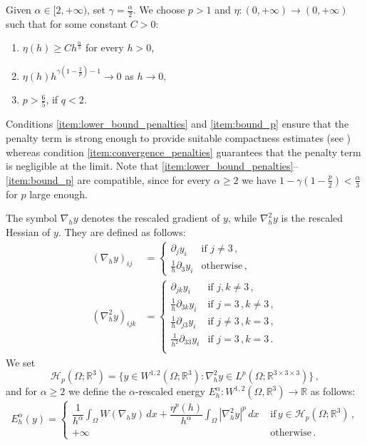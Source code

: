 \documentclass{article}
\theoremstyle{plain}
\theoremstyle{plain}
\theoremstyle{plain}
\theoremstyle{plain}
\theoremstyle{plain}
\theoremstyle{definition}
\theoremstyle{definition}
\renewcommand{\r}{\mathbb{R}}
\newcommand{\dint}{\displaystyle\int}
\begin{document}
Given $\alpha \in [2, +\infty)$, set $\gamma = \frac{\alpha}{2}$. We choose $p > 1$ and $\eta \colon (0, +\infty) \to (0, +\infty)$ such that for some constant $C > 0$:
\begin{enumerate}[start=1,label={(P\arabic*)}]
    \item $\eta(h) \geq C h^{\frac{\alpha}{3}}$ for every $h > 0$, \label{item:lower_bound_penalties} 
    \item $\eta(h) h^{\gamma(1-\frac{2}{p}) - 1} \to 0$ as $h \to 0$, \label{item:convergence_penalties}
    \item $p > \frac{6}{5}$, if $q < 2$. \label{item:bound_p}
\end{enumerate}
Conditions \ref{item:lower_bound_penalties} and \ref{item:bound_p} ensure that the penalty term is strong enough to provide suitable compactness estimates (see ) whereas condition \ref{item:convergence_penalties} guarantees that the penalty term is negligible at the limit.
Note that \ref{item:lower_bound_penalties}--\ref{item:bound_p} are compatible, since for every $ \alpha \geq 2 $ we have $ 1-\gamma(1- \frac{p}{2}) < \frac{\alpha}{3} $ for $ p $ large enough. 

The symbol $\nabla_h y$ denotes the rescaled gradient of $y$, while $\nabla_h^2 y$ is the rescaled Hessian of $y$. They are defined as follows:
\begin{align}
	(\nabla_h y)_{ij} & = \begin{cases}
		\partial_j y_i & \text{if } j \neq 3\,,\\
		\frac{1}{h} \partial_3 y_i & \text{otherwise}\,,
	\end{cases}\\
	(\nabla_h^2 y)_{ijk} & = \begin{cases}
		\partial_{jk} y_i & \text{if } j,k \neq 3\,,\\
		\frac{1}{h} \partial_{3k} y_i & \text{if } j = 3\,,k \neq 3\,,\\
		\frac{1}{h} \partial_{j3} y_i & \text{if } j \neq 3\,,k = 3\,,\\
		\frac{1}{h^2} \partial_{33} y_i & \text{if } j = 3\,,k = 3\,.\\
	\end{cases}
\end{align}
We set 
\[
    \mathcal{H}_p(\Omega; \r^3) = \{y \in W^{1,2}(\Omega; \r^3) \colon \nabla^2_h y \in L^p(\Omega; \r^{3 \times 3 \times 3})\}\,,
\]
and for $\alpha \geq 2$ we define the $\alpha$-rescaled energy $E^\alpha_h \colon W^{1,2}(\Omega, \r^3) \to \r$ as follows:
\begin{equation}\label{eq:rescaled_energy}
    E^\alpha_h(y) = \begin{cases}
        \dfrac{1}{h^\alpha}\dint_\Omega W(\nabla_h y) \, dx + \dfrac{\eta^p(h)}{h^\alpha}\dint_\Omega |\nabla_h^2 y|^p \, dx \, \, & \text{if} \, y \in \mathcal{H}_p(\Omega; \r^3) \,,\\
        + \infty \,\, & \text{otherwise} \,.
    \end{cases}
\end{equation}
\end{document}

